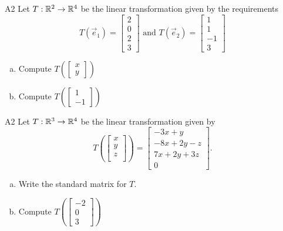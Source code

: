\begin{problem}{A2}
Let $T: \mathbb{R}^2\rightarrow \mathbb{R}^4$ be the linear transformation given by the requirements
\[ T(\vec e_1)=\begin{bmatrix}
2   \\ 0   \\ 2  \\ 3
\end{bmatrix} \text{ and }
T(\vec e_2)=\begin{bmatrix}
1   \\  1  \\ -1  \\ 3
\end{bmatrix} \]
\begin{enumerate}[(a)]
\item Compute \( T\left( \begin{bmatrix}x\\ y  \end{bmatrix} \right) \)
\item Compute \(T\left( \begin{bmatrix}  1 \\ -1 \end{bmatrix}\right)\)
\end{enumerate}
\end{problem}

\begin{problem}{A2}
Let $T: \mathbb{R}^3\rightarrow \mathbb{R}^4$ be the linear transformation given by $$T\left(\begin{bmatrix} x \\ y \\ z \\  \end{bmatrix} \right) = \begin{bmatrix} -3x+y \\ -8x+2y-z \\ 7x+2y+3z \\ 0 \end{bmatrix}.$$
\begin{enumerate}[(a)]
\item Write the standard matrix for $T$.
\item Compute \( T\left( \begin{bmatrix}-2 \\ 0 \\ 3 \end{bmatrix} \right) \)
\end{enumerate}
\end{problem}



